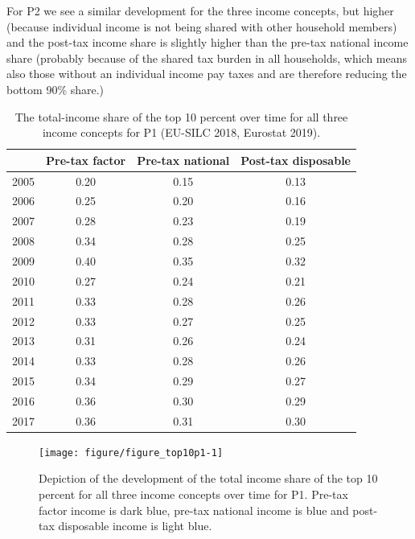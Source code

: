 \documentclass[a4paper]{article}\usepackage[]{graphicx}\usepackage[]{color}
\newenvironment{knitrout}{}{} %
\begin{document}
For P2 we see a similar development for the three income concepts, but higher (because individual income is not being shared with other household members) and the post-tax income share is slightly higher than the pre-tax national income share (probably because of the shared tax burden in all households, which means also those without an individual income pay taxes and are therefore reducing the bottom 90\% share.)
\begin{table}[ht]
\centering
\begin{tabular}{lccc}
  \toprule
 & Pre-tax factor & Pre-tax national & Post-tax disposable \\ 
  \midrule
2005 & 0.20 & 0.15 & 0.13 \\ 
  2006 & 0.25 & 0.20 & 0.16 \\ 
  2007 & 0.28 & 0.23 & 0.19 \\ 
  2008 & 0.34 & 0.28 & 0.25 \\ 
  2009 & 0.40 & 0.35 & 0.32 \\ 
  2010 & 0.27 & 0.24 & 0.21 \\ 
  2011 & 0.33 & 0.28 & 0.26 \\ 
  2012 & 0.33 & 0.27 & 0.25 \\ 
  2013 & 0.31 & 0.26 & 0.24 \\ 
  2014 & 0.33 & 0.28 & 0.26 \\ 
  2015 & 0.34 & 0.29 & 0.27 \\ 
  2016 & 0.36 & 0.30 & 0.29 \\ 
  2017 & 0.36 & 0.31 & 0.30 \\ 
   \bottomrule
\end{tabular}
\caption{The total-income share of the top 10 percent over time for all three income concepts for P1 (EU-SILC 2018, Eurostat 2019).} 
\label{top10p1}
\end{table}


\begin{knitrout}
\color{fgcolor}\begin{figure}[H]

{\centering \texttt{[image: figure/figure\_top10p1-1]} 

}

\caption[Depiction of the development of the total income share of the top 10 percent for all three income concepts over time for P1]{Depiction of the development of the total income share of the top 10 percent for all three income concepts over time for P1. Pre-tax factor income is dark blue, pre-tax national income is blue and post-tax disposable income is light blue.}\label{fig:figure_top10p1}
\end{figure}


\end{knitrout}
\end{document}
